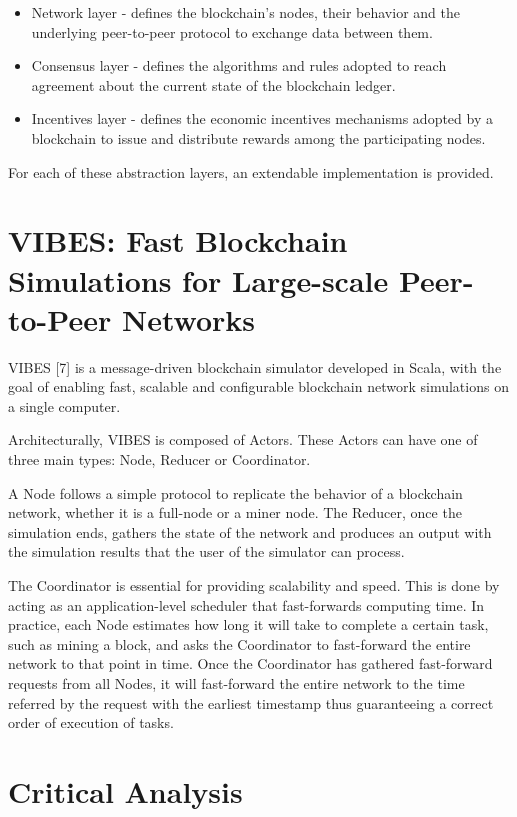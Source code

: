 \begin{itemize}
	\item Network layer - defines the blockchain’s nodes, their behavior and the underlying peer-to-peer protocol to exchange data between them.
	\item Consensus layer - defines the algorithms and rules adopted to reach agreement about the current state of the blockchain ledger.
	\item Incentives layer - defines the economic incentives mechanisms adopted by a blockchain to issue and distribute rewards among the participating nodes.
\end{itemize}

For each of these abstraction layers, an extendable implementation is provided.


\section{VIBES: Fast Blockchain Simulations for Large-scale Peer-to-Peer Networks}
\label{sec:vibes}

VIBES [7] is a message-driven blockchain simulator developed in Scala, with the goal of enabling fast, scalable and configurable blockchain network simulations on a single computer.

Architecturally, VIBES is composed of Actors. These Actors can have one of three main types: Node, Reducer or Coordinator.

A Node follows a simple protocol to replicate the behavior of a blockchain network, whether it is a full-node or a miner node. The Reducer, once the simulation ends, gathers the state of the network and produces an output with the simulation results that the user of the simulator can process.

The Coordinator is essential for providing scalability and speed. This is done by acting as an application-level scheduler that fast-forwards computing time. In practice, each Node estimates how long it will take to complete a certain task, such as mining a block, and asks the Coordinator to fast-forward the entire network to that point in time. Once the Coordinator has gathered fast-forward requests from all Nodes, it will fast-forward the entire network to the time referred by the request with the earliest timestamp thus guaranteeing a correct order of execution of tasks.


\section{Critical Analysis}
\label{sec:critical_analysis}

